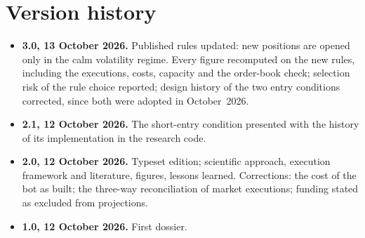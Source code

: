 \documentclass[11pt,a4paper]{article}
\begin{document}
\section{Version history}
\begin{itemize}
\item \textbf{3.0, 13 October 2026.} Published rules updated: new positions are opened only in the calm volatility regime. Every
  figure recomputed on the new rules, including the \NExec{} executions, costs, capacity and the order-book check; selection risk
  of the rule choice reported; design history of the two entry conditions corrected, since both were adopted in October~2026.
\item \textbf{2.1, 12 October 2026.} The short-entry condition presented with the history of its implementation in the research code.
\item \textbf{2.0, 12 October 2026.} Typeset edition; scientific approach, execution framework and literature, figures, lessons
  learned. Corrections: the cost of the bot as built; the three-way reconciliation of market executions; funding stated as
  excluded from projections.
\item \textbf{1.0, 12 October 2026.} First dossier.
\end{itemize}
\end{document}
